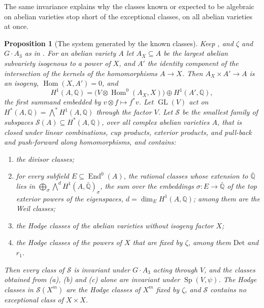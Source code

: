 \documentclass[11pt,reqno]{amsart}
\theoremstyle{plain}
\newtheorem{proposition}[theorem]{Proposition}
\theoremstyle{definition}
\theoremstyle{remark}
\newcommand{\QQ}{\mathbb{Q}}
\newcommand{\cS}{\mathcal{S}}
\DeclareMathOperator{\End}{End}
\DeclareMathOperator{\Hom}{Hom}
\DeclareMathOperator{\GL}{GL}
\DeclareMathOperator{\Sp}{Sp}
\begin{document}
The same invariance explains why the classes known or expected to be
algebraic on abelian varieties stop short of the exceptional classes, on all
abelian varieties at once.

\begin{proposition}[The system generated by the known classes]\label{prop:mumfordformal}
Keep , and $\zeta$ and $G\cdot A_{3}$ as in
. For an abelian variety $A$ let $A_{X}\subseteq A$
be the largest abelian subvariety isogenous to a power of $X$, and $A'$ the
identity component of the intersection of the kernels of the homomorphisms
$A\to X$. Then $A_{X}\times A'\to A$ is an isogeny, $\Hom(X,A')=0$, and
\[
  H^{1}(A,\QQ)=\bigl(V\otimes\Hom^{0}(A_{X},X)\bigr)\oplus H^{1}(A',\QQ),
\]
the first summand embedded by $v\otimes f\mapsto f^{*}v$. Let $\GL(V)$ act on
$H^{*}(A,\QQ)={\textstyle\bigwedge^{*}}H^{1}(A,\QQ)$ through the factor $V$. Let $\cS$
be the smallest family of subspaces $\cS(A)\subseteq H^{*}(A,\QQ)$, over all
complex abelian varieties $A$, that is closed under linear combinations, cup
products, exterior products, and pull-back and push-forward along
homomorphisms, and contains:
\begin{enumerate}[label=\textup{(\alph*)},leftmargin=2.6em,itemsep=1pt]
\item the divisor classes;
\item for every subfield $E\subseteq\End^{0}(A)$, the rational classes whose
  extension to $\bar{\QQ}$ lies in $\bigoplus_{\sigma}{\textstyle\bigwedge^{d}}
  H^{1}(A,\bar{\QQ})_{\sigma}$, the sum over the embeddings
  $\sigma\colon E\to\bar{\QQ}$ of the top exterior powers of the eigenspaces,
  $d=\dim_{E}H^{1}(A,\QQ)$; among them are the Weil classes;
\item the Hodge classes of the abelian varieties without isogeny factor $X$;
\item the Hodge classes of the powers of $X$ that are fixed by $\zeta$, among
  them $\mathrm{Det}$ and $r_{1}$.
\end{enumerate}
Then every class of $\cS$ is invariant under $G\cdot A_{3}$ acting through
$V$, and the classes obtained from \textup{(a)}, \textup{(b)} and
\textup{(c)} alone are invariant under $\Sp(V,\psi)$. The Hodge classes in
$\cS(X^{m})$ are the Hodge classes of $X^{m}$ fixed by $\zeta$, and $\cS$
contains no exceptional class of $X\times X$.
\end{proposition}
\end{document}
